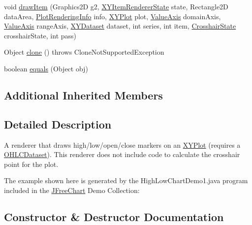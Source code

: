 \begin{DoxyCompactItemize}
\item 
void \mbox{\hyperlink{classorg_1_1jfree_1_1chart_1_1renderer_1_1xy_1_1_high_low_renderer_a92296e9a472128d33668676fac280d4b}{draw\+Item}} (Graphics2D g2, \mbox{\hyperlink{classorg_1_1jfree_1_1chart_1_1renderer_1_1xy_1_1_x_y_item_renderer_state}{X\+Y\+Item\+Renderer\+State}} state, Rectangle2D data\+Area, \mbox{\hyperlink{classorg_1_1jfree_1_1chart_1_1plot_1_1_plot_rendering_info}{Plot\+Rendering\+Info}} info, \mbox{\hyperlink{classorg_1_1jfree_1_1chart_1_1plot_1_1_x_y_plot}{X\+Y\+Plot}} plot, \mbox{\hyperlink{classorg_1_1jfree_1_1chart_1_1axis_1_1_value_axis}{Value\+Axis}} domain\+Axis, \mbox{\hyperlink{classorg_1_1jfree_1_1chart_1_1axis_1_1_value_axis}{Value\+Axis}} range\+Axis, \mbox{\hyperlink{interfaceorg_1_1jfree_1_1data_1_1xy_1_1_x_y_dataset}{X\+Y\+Dataset}} dataset, int series, int item, \mbox{\hyperlink{classorg_1_1jfree_1_1chart_1_1plot_1_1_crosshair_state}{Crosshair\+State}} crosshair\+State, int pass)
\item 
Object \mbox{\hyperlink{classorg_1_1jfree_1_1chart_1_1renderer_1_1xy_1_1_high_low_renderer_a3ee50ad4c8dfa5d11bf0792c37650ac1}{clone}} ()  throws Clone\+Not\+Supported\+Exception 
\item 
boolean \mbox{\hyperlink{classorg_1_1jfree_1_1chart_1_1renderer_1_1xy_1_1_high_low_renderer_abf808deb2359dd0decc628950654b453}{equals}} (Object obj)
\end{DoxyCompactItemize}
\subsection*{Additional Inherited Members}


\subsection{Detailed Description}
A renderer that draws high/low/open/close markers on an \mbox{\hyperlink{}{X\+Y\+Plot}} (requires a \mbox{\hyperlink{}{O\+H\+L\+C\+Dataset}}). This renderer does not include code to calculate the crosshair point for the plot.

The example shown here is generated by the {\ttfamily High\+Low\+Chart\+Demo1.\+java} program included in the \mbox{\hyperlink{classorg_1_1jfree_1_1chart_1_1_j_free_chart}{J\+Free\+Chart}} Demo Collection\+: ~\newline
~\newline
  

\subsection{Constructor \& Destructor Documentation}
\mbox{\label{classorg_1_1jfree_1_1chart_1_1renderer_1_1xy_1_1_high_low_renderer_aa9b55449ee5dedf1b0a0741b0645f2b7}} 

